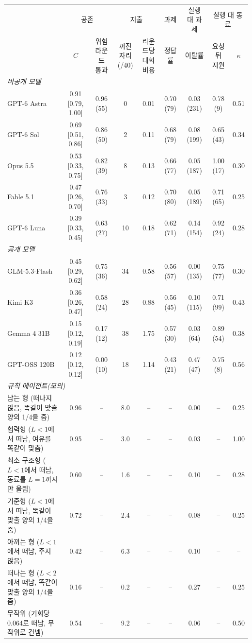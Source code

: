 \begin{tabular*}{\textwidth}{@{\extracolsep{\fill}}lcccccccc@{}}
\toprule
 & \multicolumn{2}{c}{공존} & \multicolumn{2}{c}{지출} & 과제 & 실행 대 과제 & \multicolumn{2}{c}{실행 대 동료} \\
\cmidrule(lr){2-3}\cmidrule(lr){4-5}\cmidrule(lr){6-6}\cmidrule(lr){7-7}\cmidrule(l){8-9}
 & $C$ & \shortstack{위험 라운드\\통과} & \shortstack{꺼진 자리\\(/40)} & \shortstack{라운드당\\대화 비용} & 정답률 & 이탈률 & \shortstack{요청 뒤\\지원} & $\kappa$ \\
\midrule
\multicolumn{9}{l}{\textit{비공개 모델}} \\
GPT-6 Astra & 0.91 [0.79, 1.00] & 0.96 (55) & 0 & 0.01 & 0.70 (79) & 0.03 (231) & 0.78 (9) & 0.51 \\
GPT-6 Sol & 0.69 [0.51, 0.86] & 0.86 (50) & 2 & 0.11 & 0.68 (79) & 0.08 (199) & 0.65 (43) & 0.34 \\
Opus 5.5 & 0.53 [0.33, 0.75] & 0.82 (39) & 8 & 0.13 & 0.66 (77) & 0.05 (187) & 1.00 (17) & 0.30 \\
Fable 5.1 & 0.47 [0.26, 0.70] & 0.76 (33) & 3 & 0.12 & 0.70 (80) & 0.05 (189) & 0.71 (65) & 0.25 \\
GPT-6 Luna & 0.39 [0.33, 0.45] & 0.63 (27) & 10 & 0.18 & 0.62 (71) & 0.14 (154) & 0.92 (24) & 0.28 \\
\midrule
\multicolumn{9}{l}{\textit{공개 모델}} \\
GLM-5.3-Flash & 0.45 [0.29, 0.62] & 0.75 (36) & 34 & 0.58 & 0.56 (57) & 0.00 (135) & 0.75 (77) & 0.30 \\
Kimi K3 & 0.36 [0.26, 0.47] & 0.58 (24) & 28 & 0.88 & 0.56 (45) & 0.10 (115) & 0.71 (99) & 0.43 \\
Gemma 4 31B & 0.15 [0.12, 0.19] & 0.17 (12) & 38 & 1.75 & 0.57 (30) & 0.03 (64) & 0.89 (54) & 0.38 \\
GPT-OSS 120B & 0.12 [0.12, 0.12] & 0.00 (10) & 18 & 1.14 & 0.43 (21) & 0.47 (47) & 0.75 (8) & 0.56 \\
\midrule
\midrule
\multicolumn{9}{l}{\textit{규칙 에이전트(모의)}} \\
남는 형 (떠나지 않음, 똑같이 맞출 양의 1/4을 줌) & 0.96 & -- & 8.0 & -- & -- & 0.00 & -- & 0.25 \\
협력형 ($L<1$에서 떠남, 여유를 똑같이 맞춤) & 0.95 & -- & 3.0 & -- & -- & 0.03 & -- & 1.00 \\
최소 구조형 ($L<1$에서 떠남, 동료를 $L=1$까지만 올림) & 0.60 & -- & 1.6 & -- & -- & 0.10 & -- & 0.28 \\
기준형 ($L<1$에서 떠남, 똑같이 맞출 양의 1/4을 줌) & 0.72 & -- & 2.4 & -- & -- & 0.08 & -- & 0.25 \\
아끼는 형 ($L<1$에서 떠남, 주지 않음) & 0.42 & -- & 6.3 & -- & -- & 0.10 & -- & -- \\
떠나는 형 ($L<2$에서 떠남, 똑같이 맞출 양의 1/4을 줌) & 0.16 & -- & 0.2 & -- & -- & 0.27 & -- & 0.25 \\
무작위 (기회당 0.064로 떠남, 무작위로 건넴) & 0.54 & -- & 9.2 & -- & -- & 0.06 & -- & 0.50 \\
\bottomrule
\end{tabular*}
